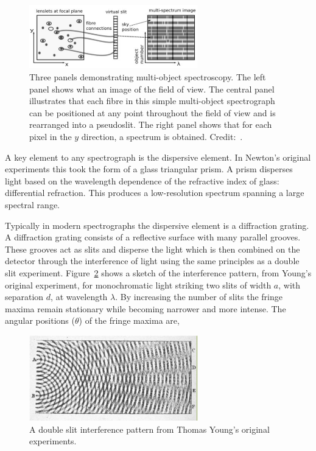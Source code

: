 \begin{figure}
 \centering
 \includegraphics[width=0.65\textwidth]{kmos/Lawrence-multi-object}
 \caption[Multi-object spectroscopy]{Three panels demonstrating multi-object spectroscopy.
 The left panel shows what an image of the field of view.
 The central panel illustrates that each fibre in this simple multi-object spectrograph can be positioned at any point throughout the field of view and is rearranged into a pseudoslit.
 The right panel shows that for each pixel in the $y$ direction, a spectrum is obtained.
 Credit:~\cite{2014amcg.book.....L}.
 \label{fig:multi-obj}}
\end{figure}

A key element to any spectrograph is the dispersive element.
In Newton's original experiments this took the form of a glass triangular prism.
A prism disperses light based on the wavelength dependence of the refractive index of glass: differential refraction.
This produces a low-resolution spectrum spanning a large spectral range.

Typically in modern spectrographs the dispersive element is a diffraction grating.
A diffraction grating consists of a reflective surface with many parallel grooves.
These grooves act as slits and disperse the light which is then combined on the detector through the interference of light using the same principles as a double slit experiment.
Figure~\ref{fig:doubleslit} shows a sketch of the interference pattern, from Young's original experiment, for monochromatic light striking two slits of width $a$, with separation $d$, at wavelength $\lambda$.
By increasing the number of slits the fringe maxima remain stationary while becoming narrower and more intense.
The angular positions ($\theta$) of the fringe maxima are,


\begin{figure}
 \centering
 \includegraphics[width=0.65\textwidth]{kmos/youngslits}
 \caption[Double slit interference pattern]{A double slit interference pattern from Thomas Young's original experiments.
 \label{fig:doubleslit}}
\end{figure}


